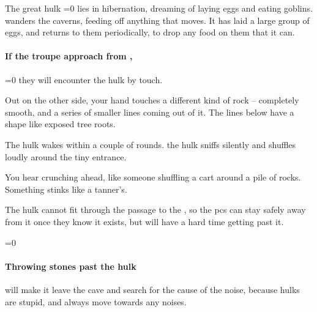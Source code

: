 \begin{multicols}{2}

\playCommentaryRestI

\playCommentaryRestII[b]


\begin{exampletext}
  The great \gls{hulk} %
  \ifnum\value{temperature}=0
    lies in hibernation, dreaming of laying eggs and eating goblins.
  \else
    wanders the caverns, feeding off anything that moves.
    It has laid a large group of eggs, and returns to them periodically, to drop any food on them that it can.
  \fi
\end{exampletext}

\paragraph{If the troupe approach from ,}
\ifnum\value{temperature}=0%
  they will encounter the \gls{hulk} by touch.

  \begin{boxtext}
    Out on the other side, your hand touches a different kind of rock -- completely smooth, and a series of smaller lines coming out of it.
    The lines below have a shape like exposed tree roots.
  \end{boxtext}

  The \gls{hulk} wakes within a couple of \glspl{round}.
\else%
  the \gls{hulk} sniffs silently and shuffles loudly around the tiny entrance.

  \begin{boxtext}
    You hear crunching ahead, like someone shuffling a cart around a pile of rocks.
    Something stinks like a tanner's.
  \end{boxtext}
\fi

The \gls{hulk} cannot fit through the passage to the , so the \glspl{pc} can stay safely away from it once they know it exists, but will have a hard time getting past it.

\ifnum\value{temperature}=0\else
  \paragraph{Throwing stones past the \gls{hulk}}
  will make it leave the cave and search for the cause of the noise, because \glspl{hulk} are stupid, and always move towards any noises.
\fi

\umberhulk


\end{multicols}

